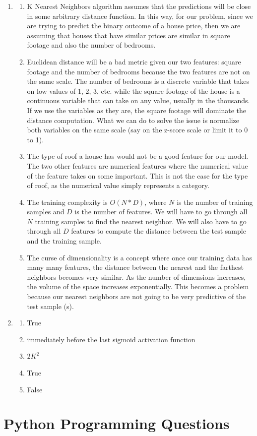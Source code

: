 \documentclass[12pt]{article}
\begin{document}
\begin{enumerate}
\begin{enumerate}
  \end{enumerate}
 \item
 \begin{enumerate}
     \item K Nearest Neighbors algorithm assumes that the predictions will be close in some arbitrary distance function. In this way, for our problem, since we are trying to predict the binary outcome of a house price, then we are assuming that houses that have similar prices are similar in square footage and also the number of bedrooms.
     \item Euclidean distance will be a bad metric given our two features: square footage and the number of bedrooms because the two features are not on the same scale. The number of bedrooms is a discrete variable that takes on low values of 1, 2, 3, etc. while the square footage of the house is a continuous variable that can take on any value, usually in the thousands. If we use the variables as they are, the square footage will dominate the distance computation. What we can do to solve the issue is normalize both variables on the same scale (say on the z-score scale or limit it to 0 to 1).
     \item The type of roof a house has would not be a good feature for our model. The two other features are numerical features where the numerical value of the feature takes on some important. This is not the case for the type of roof, as the numerical value simply represents a category. 
     \item The training complexity is $O(N * D)$, where $N$ is the number of training samples and $D$ is the number of features. We will have to go through all $N$ training samples to find the nearest neighbor. We will also have to go through all $D$ features to compute the distance between the test sample and the training sample.
     \item The curse of dimensionality is a concept where once our training data has many many features, the distance between the nearest and the farthest neighbors becomes very similar. As the number of dimensions increases, the volume of the space increases exponentially. This becomes a problem because our nearest neighbors are not going to be very predictive of the test sample (s).
 \end{enumerate}

 \item 
 \begin{enumerate}
      \item True 
      \item immediately before the last sigmoid activation function
      \item $2K^2$
      \item True
      \item False
 \end{enumerate}

\end{enumerate}

\section{Python Programming Questions}

\end{document}
